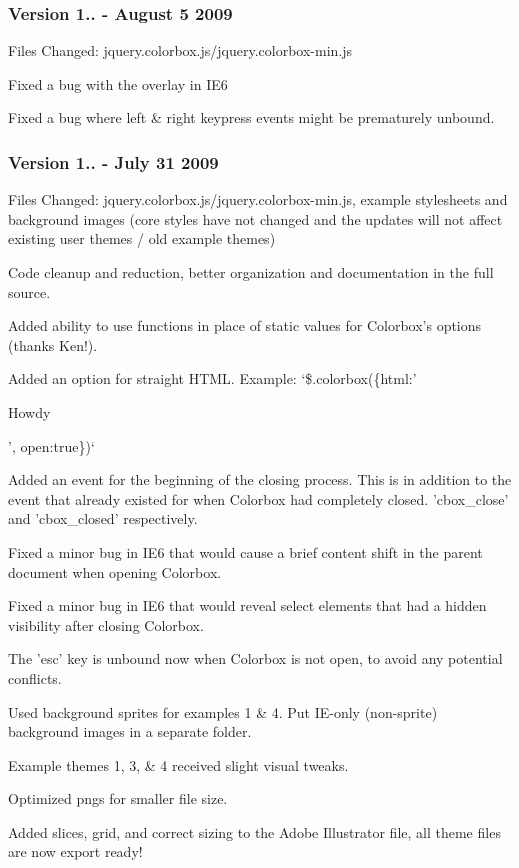\subsubsection*{Version 1.. -\/ August 5 2009}

Files Changed\-: jquery.\-colorbox.\-js/jquery.colorbox-\/min.\-js


\begin{DoxyItemize}
\item Fixed a bug with the overlay in I\-E6
\item Fixed a bug where left \& right keypress events might be prematurely unbound.
\end{DoxyItemize}

\subsubsection*{Version 1.. -\/ July 31 2009}

Files Changed\-: jquery.\-colorbox.\-js/jquery.colorbox-\/min.\-js, example stylesheets and background images (core styles have not changed and the updates will not affect existing user themes / old example themes)


\begin{DoxyItemize}
\item Code cleanup and reduction, better organization and documentation in the full source.
\item Added ability to use functions in place of static values for Colorbox's options (thanks Ken!).
\item Added an option for straight H\-T\-M\-L. Example\-: `\$.colorbox(\{html\-:'
\end{DoxyItemize}

Howdy

', open\-:true\})`
\begin{DoxyItemize}
\item Added an event for the beginning of the closing process. This is in addition to the event that already existed for when Colorbox had completely closed. 'cbox\-\_\-close' and 'cbox\-\_\-closed' respectively.
\item Fixed a minor bug in I\-E6 that would cause a brief content shift in the parent document when opening Colorbox.
\item Fixed a minor bug in I\-E6 that would reveal select elements that had a hidden visibility after closing Colorbox.
\item The 'esc' key is unbound now when Colorbox is not open, to avoid any potential conflicts.
\item Used background sprites for examples 1 \& 4. Put I\-E-\/only (non-\/sprite) background images in a separate folder.
\item Example themes 1, 3, \& 4 received slight visual tweaks.
\item Optimized pngs for smaller file size.
\item Added slices, grid, and correct sizing to the Adobe Illustrator file, all theme files are now export ready!
\end{DoxyItemize}

